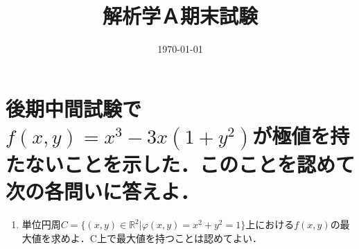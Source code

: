\documentclass[a4paper,10pt]{jarticle}
\title{解析学Ａ期末試験}
\date{\today}
\begin{document}
\setlength{\parindent}{0pt}
\setlength{\columnseprule}{0.4pt}

\renewcommand{\thesection}{\fbox{\arabic{section}}}
\renewcommand{\labelenumi}{(\theenumi)}

\maketitle

\section{後期中間試験で$f(x,y)=x^3-3x(1+y^2)$が極値を持たないことを示した．このことを認めて次の各問いに答えよ．}
\begin{enumerate}
\item 単位円周$C=\{(x,y) \in \mathbb{R}^2 | \varphi(x,y)=x^2+y^2=1\}$上における$f(x,y)$の最大値を求めよ．C上で最大値を持つことは認めてよい．



\end{enumerate}
\end{document}
